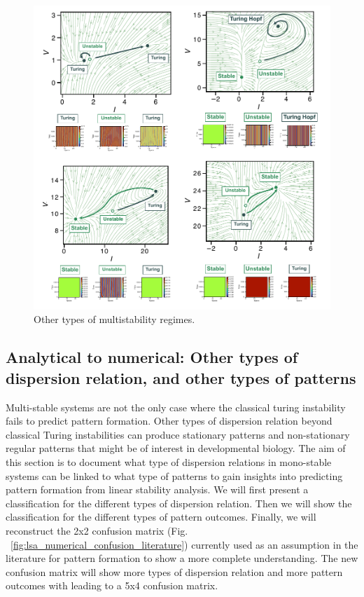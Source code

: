 \begin{figure}[H] %
    \centering
    \begin{adjustbox}{center}
    \includegraphics[width=1.4\textwidth]{chapters/Chapter 1/multistability_leftover} %
    \end{adjustbox}
    \caption{Other types of multistability regimes.}
    \label{fig:multistability_leftover} %
\end{figure}


\subsection{Analytical to numerical: Other types of dispersion relation, and other types of patterns}
Multi-stable systems are not the only case where the classical turing instability fails to predict pattern formation.
Other types of dispersion relation beyond classical Turing instabilities can produce stationary patterns and non-stationary regular patterns that might be of interest in developmental biology.
The aim of this section is to document what type of dispersion relations in mono-stable systems can be linked to what type of patterns to gain insights into predicting pattern formation from linear stability analysis.
We will first present a classification for the different types of dispersion relation.
Then we will show the classification for the different types of pattern outcomes.
Finally, we will reconstruct the 2x2 confusion matrix (Fig. ~\ref{fig:lsa_numerical_confusion_literature}) currently used as an assumption in the literature for pattern formation to show a more complete understanding. The new confusion matrix will show more types of dispersion relation and more pattern outcomes with leading to a 5x4 confusion matrix.

